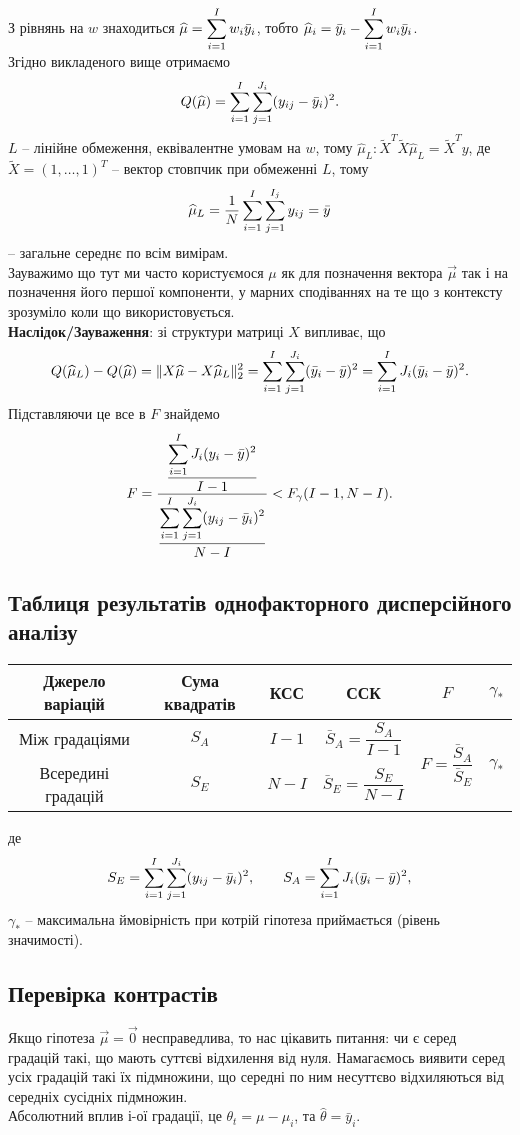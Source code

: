 З рівнянь на $w$ знаходиться $\widehat{\mu} = \displaystyle\sum\limits_{i=1}^I  w_i\bar{y}_i$, тобто $\widehat{\mu}_i = \bar{y}_i - \displaystyle\sum\limits_{i=1}^I  w_i\bar{y}_i$. \\

Згідно викладеного вище отримаємо \[ Q(\widehat{\mu}) = \displaystyle\sum\limits_{i=1}^I \sum_{j=1}^{J_i} (y_{ij}-\bar{y}_i)^2. \]
$L$ -- лінійне обмеження, еквівалентне умовам на $w$, тому $\widehat{\mu}_L: \widetilde{X}^T\widetilde{X}\widehat{\mu}_L=\widetilde{X}^Ty$, де $\widetilde{X} = (1, \ldots, 1)^T$ -- вектор стовпчик при обмеженні $L$, тому \[\widehat{\mu}_L = \dfrac{1}{N} \displaystyle\sum\limits_{i=1}^I \displaystyle\sum\limits_{j=1}^{I_j} y_{ij} = \bar{y}\] -- загальне середнє по всім вимірам. \\

Зауважимо що тут ми часто користуємося $\mu$ як для позначення вектора $\vec\mu$ так і на позначення його першої компоненти, у марних сподіваннях на те що з контексту зрозуміло коли що використовується. \\

\textbf{Наслідок/Зауваження}: зі структури матриці $X$ випливає, що \[ Q(\widehat{\mu}_L)-Q(\widehat{\mu})=\|X\widehat{\mu}-X\widehat{\mu}_L\|_2^2 = \displaystyle\sum\limits_{i=1}^I\displaystyle\sum\limits_{j=1}^{J_i}(\bar{y}_i-\bar{y})^2 =  \displaystyle\sum\limits_{i=1}^I J_i(\bar{y}_i-\bar{y})^2. \]
Підставляючи це все в $F$ знайдемо \[ F = \dfrac{\dfrac{\displaystyle\sum\limits_{i=1}^IJ_i(y_i-\bar{y})^2}{I-1}}{\dfrac{\displaystyle\sum\limits_{i=1}^I\displaystyle\sum\limits_{j=1}^{J_i}(y_{ij}-\bar{y}_i)^2}{N-I}} < F_\gamma(I-1,N-I). \]
\subsection{Таблиця результатів однофакторного дисперсійного аналізу}
\begin{table}[H]
	\centering
	\begin{tabular}{|c|c|c|c|c|c|}
		\hline
		Джерело варіацій & Сума квадратів & КСС & ССК & $F$ & $\gamma_*$ \\
 \hline
		Між градаціями & $S_A$ & $I - 1$ & $\bar{S}_A = \dfrac{S_A}{I - 1}$ & \multirow{2}{*}{$F = \dfrac{\bar{S}_A}{\bar{S}_E}$} & \multirow{2}{*}{$\gamma_*$} \\
 \cline{1-4}
		Всередині градацій & $S_E$ & $N - I$ & $\bar{S}_E = \dfrac{S_E}{N - I}$ & & \\
 \hline
	\end{tabular}
\end{table}
де \[ S_E = \displaystyle\sum\limits_{i=1}^I\displaystyle\sum\limits_{j=1}^{J_i}(y_{ij}-\bar{y}_i)^2, \qquad S_A = \displaystyle\sum\limits_{i=1}^I J_i(\bar{y}_i -\bar{y})^2,\] $\gamma_*$ -- максимальна ймовірність при котрій гіпотеза приймається (рівень значимості).
\subsection{Перевірка контрастів}
Якщо гіпотеза $\vec\mu=\vec0$ несправедлива, то нас цікавить питання: чи є серед градацій такі, що мають суттєві відхилення від нуля. Намагаємось виявити серед усіх градацій такі їх підмножини, що середні по ним несуттєво відхиляються від середніх сусідніх підмножин. \\

Абсолютний вплив $і$-ої градації, це $\theta_t=\mu-\mu_i$, та $\widehat{\theta}=\bar{y}_i$.